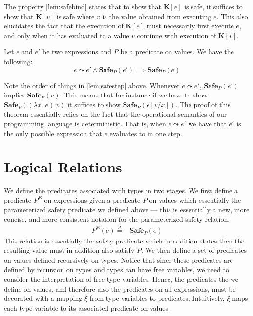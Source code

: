 \documentclass{article}
\newcommand{\ectx}{\mathbf{K}}
\newcommand{\defeq}{\overset{\Delta}{=}}
\newcommand{\pred}{P}
\newcommand{\semErel}[1]{#1^{\textbf{E}}}
\newcommand{\semenv}{\xi}
\newcommand{\expr}{e}
\newcommand{\val}{v}
\newcommand{\var}{x}
\newcommand{\step}{\leadsto}
\newcommand{\Safe}[1]{\textbf{Safe}_{#1}}
\begin{document}
The property \ref{lem:safebind} states that to show that $\ectx[\expr]$ is safe, it suffices to show that $\ectx[\val]$ is safe where $\val$ is the value obtained from executing $\expr$.
This also elucidates the fact that the execution of $\ectx[\expr]$ must necessarily first execute $\expr$, and only when it has evaluated to a value $\val$ continue with execution of $\ectx[\val]$.

\begin{safesteplemma}
  \makeatletter{}\makeatother
  \label{lem:safestep}
  Let $\expr$ and $\expr'$ be two expressions and $\pred$ be a predicate on values. We have the following:
  \[\expr \step \expr' \land \Safe{\pred}(\expr') \implies \Safe{\pred}(\expr) \]
\end{safesteplemma}

Note the order of things in \ref{lem:safestep} above.
Whenever $\expr \step \expr'$, $\Safe{\pred}(\expr')$ implies $\Safe{\pred}(\expr)$.
This means that for instance if we have to show $\Safe{\pred}((\lambda \var.\; \expr)~\val)$ it suffices to show $\Safe{\pred}(\expr[\val/\var])$.
The proof of this theorem essentially relies on the fact that the operational semantics of our programming language is deterministic.
That is, when $\expr \step \expr'$ we have that $\expr'$ is the only possible expression that $\expr$ evaluates to in one step.

\section{Logical Relations}
We define the predicates associated with types in two stages.
We first define a predicate $\semErel{\pred}$ on expressions given a predicate $\pred$ on values which essentially the parameterized safety predicate we defined above --- this is essentially a new, more concise, and more consistent notation for the parameterized safety relation.
\begin{align*}
  \semErel{\pred}(\expr) \defeq{}& \Safe{\pred}(\expr)
\end{align*}
This relation is essentially the safety predicate which in addition states then the resulting value must in addition also satisfy $\pred$.
We then define a set of predicates on values defined recursively on types.
Notice that since these predicates are defined by recursion on types and types can have free variables, we need to consider the interpretation of free type variables.
Hence, the predicates the we define on values, and therefore also the predicates on all expressions, must be decorated with a mapping $\semenv$ from type variables to predicates.
Intuitively, $\semenv$ maps each type variable to its associated predicate on values.
\end{document}
